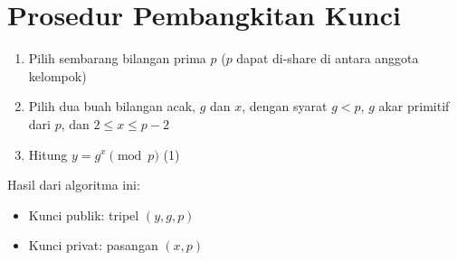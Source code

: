 \documentclass{article}
\begin{document}

\section*{Prosedur Pembangkitan Kunci}

\begin{enumerate}
    \item Pilih sembarang bilangan prima $p$ ($p$ dapat di-share di antara anggota kelompok)
    \item Pilih dua buah bilangan acak, $g$ dan $x$, dengan syarat $g < p$, $g$ akar primitif dari $p$, dan $2 \le x \le p - 2$
    \item Hitung $y = g^x \pmod{p}$ \hfill (1)
\end{enumerate}

\noindent Hasil dari algoritma ini:
\begin{itemize}
    \item Kunci publik: tripel $(y, g, p)$
    \item Kunci privat: pasangan $(x, p)$
\end{itemize}
\end{document}
